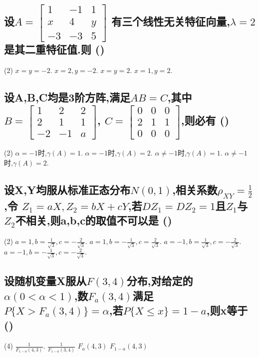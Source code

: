 \documentclass[utf8]{ctexart}
\begin{document}
\subsection{
	设$ A=
	\begin{bmatrix} 
		1&-1&1\\
		x&4&y\\
		-3&-3&5 
	\end{bmatrix} $
	有三个线性无关特征向量,$\lambda=2$是其二重特征值.则 \hfill (\qquad)
}
\begin{tasks}(2)
	\task $x=y=-2.$
	\task $x=2,y=-2.$
	\task $x=y=2.$
	\task $x=1,y=2.$
\end{tasks}
\subsection{设A,B,C均是3阶方阵,满足$AB=C$,其中
	$B=
		\begin{bmatrix}
			1&2&2\\
			2&1&1\\
			-2&-1&a
		\end{bmatrix}
	$,
	$C=
		\begin{bmatrix}
			0&0&0\\
			2&1&1\\
			0&0&0
		\end{bmatrix}
	$,则必有 \hfill (\qquad)
}
	\begin{tasks}(2)
		\task $\alpha=-1$时,$\gamma(A)=1.$
		\task $\alpha=-1$时,$\gamma(A)=2.$
		\task $\alpha\neq -1$时,$\gamma(A)=1.$
		\task $\alpha\neq -1$时,$\gamma(A)=2.$
	\end{tasks}

\subsection{
	设X,Y均服从标准正态分布$N(0,1)$,相关系数$\rho_{XY}=\frac{1}{2}$,令
	$Z_1=aX,Z_2=bX+cY$,若$DZ_1=DZ_2=1$且$Z_1$与$Z_2$不相关,则a,b,c的取值不可以是 \hfill (\qquad)
}
\begin{tasks}(2)
	\task $a=1,b=\frac{1}{\sqrt{3}},c=-\frac{2}{\sqrt{3}}.$
	\task $a=1,b=-\frac{1}{\sqrt{3}},c=\frac{2}{\sqrt{3}}.$
	\task $a=-1,b=\frac{1}{\sqrt{3}},c=-\frac{2}{\sqrt{3}}.$
	\task $a=-1,b=-\frac{1}{\sqrt{3}},c=-\frac{2}{\sqrt{3}}.$
\end{tasks}
\subsection{设随机变量X服从$F(3,4)$分布,对给定的$\alpha(0<\alpha<1)$,数$F_a(3,4)$满足$P\{X>F_a(3,4)\}=\alpha$,若$P\{X\leq x\}=1-a$,则x等于
	\hfill (\qquad)
}
\begin{tasks}(4)
	\task $\frac{1}{F_{1-a}(4,3)}.$
	\task $\frac{1}{F_{1-a}(3,4)}$
	\task ${F_{a}(4,3)}$
	\task ${F_{1-a}(4,3)}$
\end{tasks}
\end{document}
